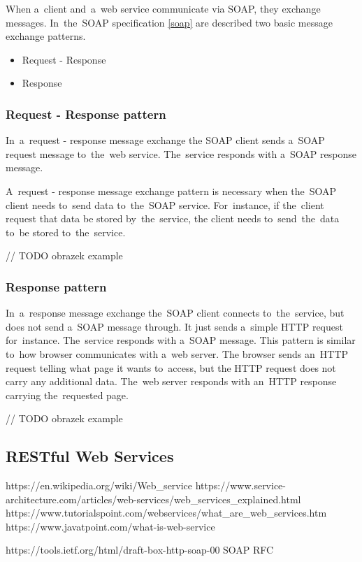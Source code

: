 When a~client and~a~web service communicate via SOAP, they exchange messages.
In~the~SOAP specification \ref{soap} are described two basic message exchange
patterns.

\begin{itemize}
  \item Request - Response
  \item Response
\end{itemize}

\subsubsection{Request - Response pattern}
In~a~request - response message exchange the SOAP client sends a~SOAP request
message to~the~web service. The~service responds with a~SOAP response message.

A~request - response message exchange pattern is necessary when the~SOAP client
needs to~send data to~the~SOAP service. For~instance, if the~client request that
data be stored by~the~service, the client needs to~send~the~data to~be stored
to~the~service.

// TODO obrazek example

\subsubsection{Response pattern}
In~a~response message exchange the~SOAP client connects to~the~service, but does
not send a~SOAP message through. It just sends a~simple HTTP request
for~instance. The~service responds with a~SOAP message. This pattern is similar
to~how browser communicates with a~web server. The browser sends an~HTTP request
telling what page it wants to~access, but the HTTP request does not carry any
additional data. The~web server responds with an~HTTP response carrying
the~requested page.

// TODO obrazek example



\subsection{RESTful Web Services}

 https://en.wikipedia.org/wiki/Web_service
https://www.service-architecture.com/articles/web-services/web_services_explained.html
https://www.tutorialspoint.com/webservices/what_are_web_services.htm
https://www.javatpoint.com/what-is-web-service

https://tools.ietf.org/html/draft-box-http-soap-00 SOAP RFC

